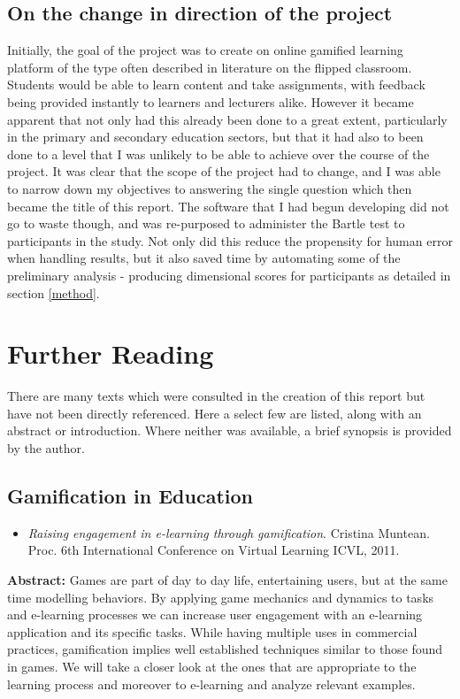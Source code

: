 \documentclass[12pt,a4paper,twoside]{report}
\begin{document}
\section{On the change in direction of the project}
Initially, the goal of the project was to create on online gamified learning platform of the type often described in literature on the flipped classroom. Students would be able to learn content and take assignments, with feedback being provided instantly to learners and lecturers alike. However it became apparent that not only had this already been done to a great extent, particularly in the primary and secondary education sectors, but that it had also to been done to a level that I was unlikely to be able to achieve over the course of the project. It was clear that the scope of the project had to change, and I was able to narrow down my objectives to answering the single question which then became the title of this report. The software that I had begun developing did not go to waste though, and was re-purposed to administer the Bartle test to participants in the study. Not only did this reduce the propensity for human error when handling results, but it also saved time by automating some of the preliminary analysis - producing dimensional scores for participants as detailed in section \ref{method}.

\chapter{Further Reading}
There are many texts which were consulted in the creation of this report but have not been directly referenced. Here a select few are listed, along with an abstract or introduction. Where neither was available, a brief synopsis is provided by the author. 

\section{Gamification in Education}

\begin{itemize}
	\item \textit{Raising engagement in e-learning through gamification}. Cristina Muntean. Proc. 6th International Conference on Virtual Learning ICVL, 2011.
\end{itemize}

\noindent \textbf{Abstract:} Games are part of day to day life, entertaining users, but at the same time modelling behaviors. By applying game mechanics and dynamics to tasks and e-learning processes we can increase user engagement with an e-learning application and its specific tasks. While having multiple uses in commercial practices, gamification implies well established techniques similar to those found in games. We will take a closer look at the ones that are appropriate to the learning process and moreover to e-learning and analyze relevant examples.
\end{document}
